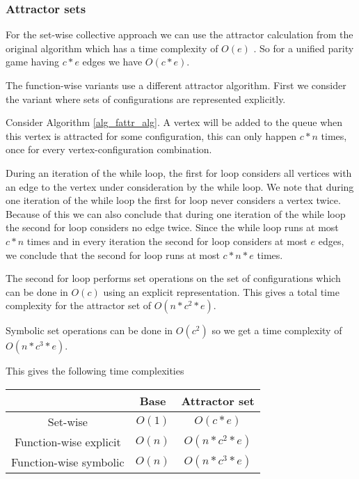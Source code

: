 \subsubsection{Attractor sets} For the set-wise collective approach we can use the attractor calculation from the original algorithm which has a time complexity of $O(e)$ \cite{Kant2013PracticalIT}. So for a unified parity game having $c*e$ edges we have $O(c*e)$.

The function-wise variants use a different attractor algorithm. First we consider the variant where sets of configurations are represented explicitly.

Consider Algorithm \ref{alg_fattr_alg}. A vertex will be added to the queue when this vertex is attracted for some configuration, this can only happen $c*n$ times, once for every vertex-configuration combination. 


During an iteration of the while loop, the first for loop considers all vertices with an edge to the vertex under consideration by the while loop. We note that during one iteration of the while loop the first for loop never considers a vertex twice. Because of this we can also conclude that during one iteration of the while loop the second for loop considers no edge twice. Since the while loop runs at most $c*n$ times and in every iteration the second for loop considers at most $e$ edges, we conclude that the second for loop runs at most $c*n*e$ times. 

The second for loop performs set operations on the set of configurations which can be done in $O(c)$ using an explicit representation. This gives a total time complexity for the attractor set of $O(n*c^2*e)$.

Symbolic set operations can be done in $O(c^2)$ so we get a time complexity of $O(n*c^3*e)$.

This gives the following time complexities\\
\begin{center}
	\begin{tabular}{|c|c|c|}
		\hline 
		& Base & Attractor set \\ 
		\hline 
		Set-wise & $O(1)$ & $O(c*e)$  \\ 
		\hline 
		Function-wise explicit & $O(n)$ &  $O(n*c^2*e)$ \\ 
		\hline 
		Function-wise symbolic & $O(n)$ &  $O(n* c^3*e)$ \\ 
		\hline 
	\end{tabular} 
\end{center}

